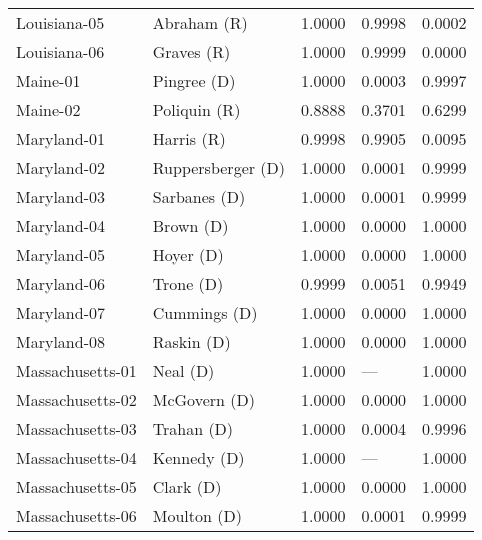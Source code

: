\begin{longtable}{llrll}
      Louisiana-05 &          {\color{Red} Abraham (R)} &       1.0000 &        0.9998 &        0.0002 \\
      Louisiana-06 &           {\color{Red} Graves (R)} &       1.0000 &        0.9999 &        0.0000 \\
          Maine-01 &         {\color{Blue} Pingree (D)} &       1.0000 &        0.0003 &        0.9997 \\
          Maine-02 &         {\color{Red} Poliquin (R)} &       0.8888 &        0.3701 &        0.6299 \\
       Maryland-01 &           {\color{Red} Harris (R)} &       0.9998 &        0.9905 &        0.0095 \\
       Maryland-02 &   {\color{Blue} Ruppersberger (D)} &       1.0000 &        0.0001 &        0.9999 \\
       Maryland-03 &        {\color{Blue} Sarbanes (D)} &       1.0000 &        0.0001 &        0.9999 \\
       Maryland-04 &           {\color{Blue} Brown (D)} &       1.0000 &        0.0000 &        1.0000 \\
       Maryland-05 &           {\color{Blue} Hoyer (D)} &       1.0000 &        0.0000 &        1.0000 \\
       Maryland-06 &           {\color{Blue} Trone (D)} &       0.9999 &        0.0051 &        0.9949 \\
       Maryland-07 &        {\color{Blue} Cummings (D)} &       1.0000 &        0.0000 &        1.0000 \\
       Maryland-08 &          {\color{Blue} Raskin (D)} &       1.0000 &        0.0000 &        1.0000 \\
  Massachusetts-01 &            {\color{Blue} Neal (D)} &       1.0000 &           --- &        1.0000 \\
  Massachusetts-02 &        {\color{Blue} McGovern (D)} &       1.0000 &        0.0000 &        1.0000 \\
  Massachusetts-03 &          {\color{Blue} Trahan (D)} &       1.0000 &        0.0004 &        0.9996 \\
  Massachusetts-04 &         {\color{Blue} Kennedy (D)} &       1.0000 &           --- &        1.0000 \\
  Massachusetts-05 &           {\color{Blue} Clark (D)} &       1.0000 &        0.0000 &        1.0000 \\
  Massachusetts-06 &         {\color{Blue} Moulton (D)} &       1.0000 &        0.0001 &        0.9999 \\

\end{longtable}

